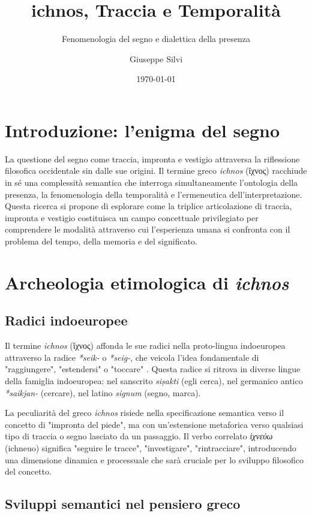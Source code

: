 \documentclass{gs}
\title{ichnos, Traccia e Temporalità}
\subtitle{Fenomenologia del segno e dialettica della presenza}
\author{Giuseppe Silvi}
\date{\today}
\begin{document}
\maketitle

\section{Introduzione: l'enigma del segno}

La questione del segno come traccia, impronta e vestigio attraversa la riflessione filosofica occidentale sin dalle sue origini. Il termine greco \textit{ichnos} (ἴχνος) racchiude in sé una complessità semantica che interroga simultaneamente l'ontologia della presenza, la fenomenologia della temporalità e l'ermeneutica dell'interpretazione. Questa ricerca si propone di esplorare come la triplice articolazione di traccia, impronta e vestigio costituisca un campo concettuale privilegiato per comprendere le modalità attraverso cui l'esperienza umana si confronta con il problema del tempo, della memoria e del significato.

\section{Archeologia etimologica di \textit{ichnos}}

\subsection{Radici indoeuropee}

Il termine \textit{ichnos} (ἴχνος) affonda le sue radici nella proto-lingua indoeuropea attraverso la radice \textit{*seik-} o \textit{*seig-}, che veicola l'idea fondamentale di "raggiungere", "estendersi" o "toccare" \cite{chantraine1968}. Questa radice si ritrova in diverse lingue della famiglia indoeuropea: nel sanscrito \textit{siṣakti} (egli cerca), nel germanico antico \textit{*saikjan-} (cercare), nel latino \textit{signum} (segno, marca).

La peculiarità del greco \textit{ichnos} risiede nella specificazione semantica verso il concetto di "impronta del piede", ma con un'estensione metaforica verso qualsiasi tipo di traccia o segno lasciato da un passaggio. Il verbo correlato \textit{ἰχνεύω} (ichneuo) significa "seguire le tracce", "investigare", "rintracciare", introducendo una dimensione dinamica e processuale che sarà cruciale per lo sviluppo filosofico del concetto.

\subsection{Sviluppi semantici nel pensiero greco}
\end{document}
